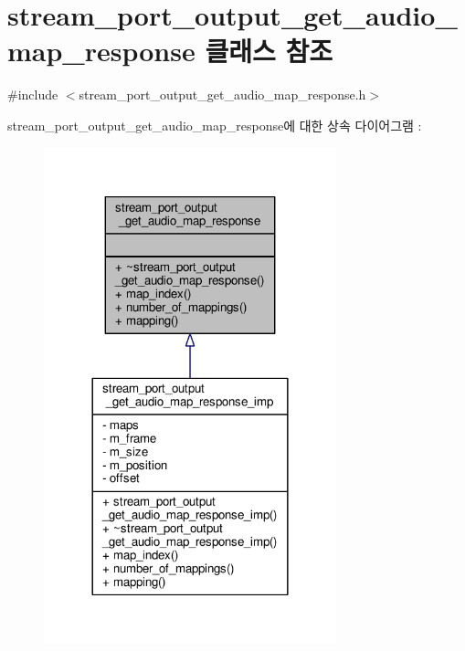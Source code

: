 \hypertarget{classavdecc__lib_1_1stream__port__output__get__audio__map__response}{}\section{stream\+\_\+port\+\_\+output\+\_\+get\+\_\+audio\+\_\+map\+\_\+response 클래스 참조}
\label{classavdecc__lib_1_1stream__port__output__get__audio__map__response}


{\ttfamily \#include $<$stream\+\_\+port\+\_\+output\+\_\+get\+\_\+audio\+\_\+map\+\_\+response.\+h$>$}



stream\+\_\+port\+\_\+output\+\_\+get\+\_\+audio\+\_\+map\+\_\+response에 대한 상속 다이어그램 \+: 
\nopagebreak
\begin{figure}[H]
\begin{center}
\leavevmode
\includegraphics[width=240pt]{classavdecc__lib_1_1stream__port__output__get__audio__map__response__inherit__graph}
\end{center}
\end{figure}


